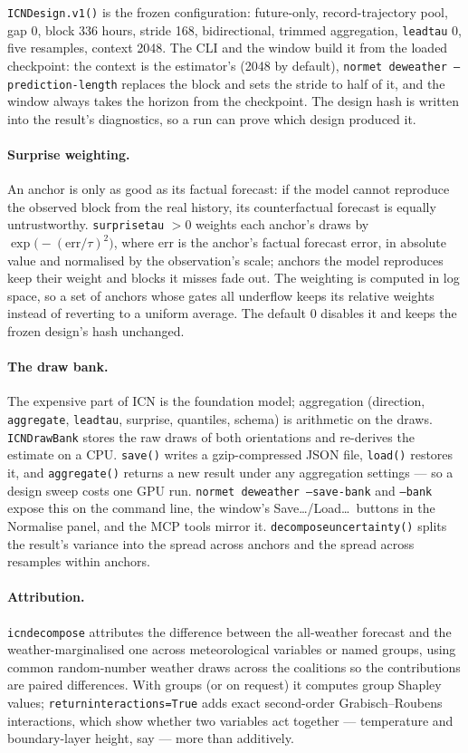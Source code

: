 \documentclass[11pt]{report}
\newcommand{\codeunderscore}{\textunderscore\allowbreak}
\newcommand{\code}[1]{\texttt{\let\_\codeunderscore #1}}
\begin{document}
\code{ICNDesign.v1()} is the frozen configuration: future-only, record-trajectory
pool, gap 0, block 336 hours, stride 168, bidirectional, trimmed aggregation,
\code{lead\_tau} 0, five resamples, context 2048. The CLI and the window build it from
the loaded checkpoint: the context is the estimator's (2048 by default), \code{normet
deweather --prediction-length} replaces the block and sets the stride to half of it, and
the window always takes the horizon from the checkpoint. The design hash is written
into the result's diagnostics, so a run can prove which design produced it.

\paragraph{Surprise weighting.} An anchor is only as good as its factual forecast: if
the model cannot reproduce the observed block from the real history, its counterfactual
forecast is equally untrustworthy. \code{surprise\_tau} $> 0$ weights each anchor's
draws by $\exp\bigl(-(\text{err}/\tau)^2\bigr)$, where err is the anchor's factual
forecast error, in absolute value and normalised by the observation's scale; anchors
the model reproduces keep their weight and blocks it misses fade out. The weighting is computed in log space, so a set of anchors whose gates all
underflow keeps its relative weights instead of reverting to a uniform average. The
default 0 disables it and keeps the frozen design's hash unchanged.

\paragraph{The draw bank.} The expensive part of ICN is the foundation model;
aggregation (direction, \code{aggregate}, \code{lead\_tau}, surprise, quantiles,
schema) is arithmetic on the draws. \code{ICNDrawBank} stores the raw draws of both
orientations and re-derives the estimate on a CPU. \code{save()} writes a
gzip-compressed JSON file, \code{load()} restores it, and \code{aggregate()} returns a
new result under any aggregation settings --- so a design sweep costs one GPU run.
\code{normet deweather --save-bank} and \code{--bank} expose this on the command
line, the window's Save\dots/Load\dots\ buttons in the Normalise panel, and the MCP
tools mirror it. \code{decompose\_uncertainty()} splits the result's variance into the
spread across anchors and the spread across resamples within anchors.

\paragraph{Attribution.} \code{icn\_decompose} attributes the difference between the
all-weather forecast and the weather-marginalised one across meteorological variables
or named groups, using common random-number weather draws across the coalitions so the
contributions are paired differences. With groups (or on request) it computes group
Shapley values; \code{return\_interactions=True} adds exact second-order
Grabisch--Roubens interactions, which show whether two variables act together ---
temperature and boundary-layer height, say --- more than additively.
\end{document}
